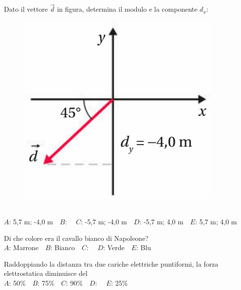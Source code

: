 \mcquestionfooter



\def\mcquestionnumber{2}


\mcquestionheader Dato il vettore $\vec{d}$ in figura, determina il modulo e la componente $d_x$: \begin{figure}[h!]   \begin{center}     \includegraphics[scale=0.35]{vettored.png}   \end{center} \end{figure}\\
{$A$}: 5,7 m; -4,0 m\ \ {$B$}: \ \ {$C$}: -5,7 m; -4,0 m\ \ {$D$}: -5,7 m; 4,0 m\ \ {$E$}: 5,7 m; 4,0 m\ \ 

\mcquestionfooter



\def\mcquestionnumber{3}


\mcquestionheader Di che colore era il cavallo bianco di Napoleone?\\
{$A$}: Marrone\ \ {$B$}: Bianco\ \ {$C$}: \ \ {$D$}: Verde\ \ {$E$}: Blu\ \ 

\mcquestionfooter



\def\mcquestionnumber{4}


\mcquestionheader Raddoppiando la distanza tra due cariche elettriche puntiformi, la forza elettrostatica diminuisce del\\
{$A$}: 50\%\ \ {$B$}: 75\%\ \ {$C$}: 90\%\ \ {$D$}: \ \ {$E$}: 25\%\ \ 

\mcquestionfooter



\def\mcquestionnumber{5}


